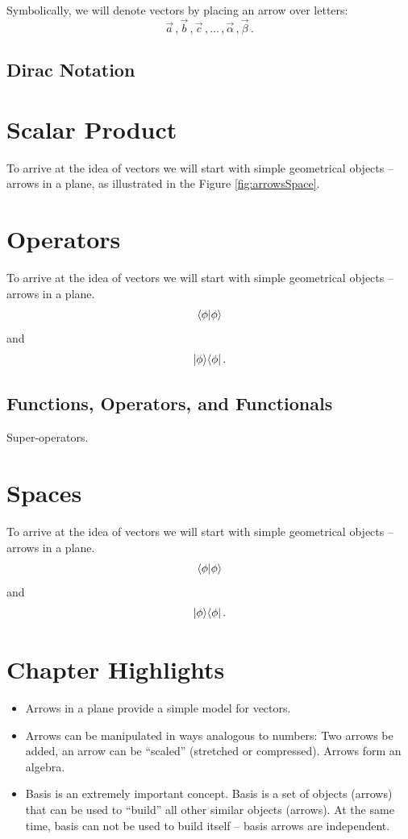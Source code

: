 Symbolically, we will denote vectors by placing an arrow over letters:
\[
\vec{a}\,,\vec{b}\,,\vec{c}\,,\ldots\,,\vec{\alpha}\,,\vec{\beta}\,.
\]

\subsection{Dirac Notation}

\section{Scalar Product}

To arrive at the idea of vectors we will start with simple geometrical
objects -- arrows in a plane, as illustrated in the Figure \ref{fig:arrowsSpace}.

\section{Operators}

To arrive at the idea of vectors we will start with simple geometrical
objects -- arrows in a plane.
\[
\langle{\phi}|{\phi\rangle}
\]
and
\[
|{\phi}\rangle\langle{\phi}|\,.
\]
\subsection{Functions, Operators, and Functionals}
Super-operators.

\section{Spaces}

To arrive at the idea of vectors we will start with simple geometrical
objects -- arrows in a plane.
\[
\langle{\phi}|{\phi\rangle}
\]
and
\[
|{\phi}\rangle\langle{\phi}|\,.
\]

\section*{Chapter Highlights}
{\chhc
  \it
\begin{itemize}
\item Arrows in a plane provide a simple model for vectors.
\item Arrows can be manipulated in ways analogous to numbers: Two arrows
  be added, an arrow can be ``scaled'' (stretched or compressed). Arrows form
  an algebra.
\item Basis is an extremely important concept. Basis is a set of
  objects (arrows) that can be used to ``build'' all other similar
  objects (arrows). At the same time, basis can not be used to build
  itself -- basis arrows are independent.
\end{itemize}
}
